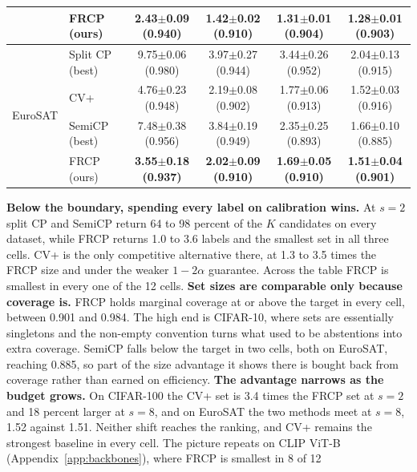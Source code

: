 \begin{table}[t]
\begin{center}
\begin{tabular}{llcccc}
 & FRCP (ours) & \textbf{2.43$\pm$0.09 {\scriptsize(0.940)}} & \textbf{1.42$\pm$0.02 {\scriptsize(0.910)}} & \textbf{1.31$\pm$0.01 {\scriptsize(0.904)}} & \textbf{1.28$\pm$0.01 {\scriptsize(0.903)}}\\
\midrule
\multirow{4}{*}{EuroSAT} & Split CP (best) & 9.75$\pm$0.06 {\scriptsize(0.980)} & 3.97$\pm$0.27 {\scriptsize(0.944)} & 3.44$\pm$0.26 {\scriptsize(0.952)} & 2.04$\pm$0.13 {\scriptsize(0.915)}\\
 & CV+ & 4.76$\pm$0.23 {\scriptsize(0.948)} & 2.19$\pm$0.08 {\scriptsize(0.902)} & 1.77$\pm$0.06 {\scriptsize(0.913)} & 1.52$\pm$0.03 {\scriptsize(0.916)}\\
 & SemiCP (best) & 7.48$\pm$0.38 {\scriptsize(0.956)} & 3.84$\pm$0.19 {\scriptsize(0.949)} & 2.35$\pm$0.25 {\scriptsize(0.893)} & 1.66$\pm$0.10 {\scriptsize(0.885)}\\
 & FRCP (ours) & \textbf{3.55$\pm$0.18 {\scriptsize(0.937)}} & \textbf{2.02$\pm$0.09 {\scriptsize(0.910)}} & \textbf{1.69$\pm$0.05 {\scriptsize(0.910)}} & \textbf{1.51$\pm$0.04 {\scriptsize(0.901)}}\\
\bottomrule
\end{tabular}
\end{center}
\end{table}
\textbf{Below the boundary, spending every label on calibration wins.}
At $s = 2$ split CP and SemiCP return 64 to 98 percent of the $K$
candidates on every dataset, while FRCP returns 1.0 to 3.6 labels and
the smallest set in all three cells. CV+ is the only competitive
alternative there, at 1.3 to 3.5 times the FRCP size and under the
weaker $1 - 2\alpha$ guarantee. Across the table FRCP is smallest in
every one of the 12 cells.
\textbf{Set sizes are comparable only because coverage is.} FRCP holds
marginal coverage at or above the target in every cell, between 0.901
and 0.984. The high end is CIFAR-10, where sets are essentially
singletons and the non-empty convention turns what used to be
abstentions into extra coverage. SemiCP falls below the target in two
cells, both on EuroSAT, reaching 0.885, so part of the size advantage
it shows there is bought back from coverage rather than earned on
efficiency.
\textbf{The advantage narrows as the budget grows.} On CIFAR-100 the
CV+ set is 3.4 times the FRCP set at $s = 2$ and 18 percent larger at
$s = 8$, and on EuroSAT the two methods meet at $s = 8$, 1.52 against
1.51. Neither shift reaches the ranking, and CV+ remains the strongest
baseline in every cell. The picture repeats on CLIP ViT-B
(Appendix~\ref{app:backbones}), where FRCP is smallest in 8 of 12
